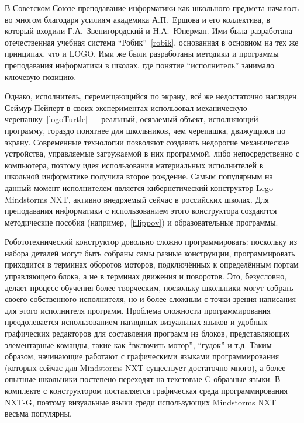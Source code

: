 \documentclass[a4paper]{article}
\begin{document}
В Советском Союзе преподавание информатики как школьного предмета началось во многом благодаря усилиям академика А.П.~Ершова и его коллектива, в который входили Г.А.~Звенигородский и Н.А.~Юнерман. Ими была разработана отечественная учебная система ``Робик''~\ref{robik}, основанная в основном на тех же принципах, что и LOGO. Ими же были разработаны методики и программы преподавания информатики в школах, где понятие ``исполнитель'' занимало ключевую позицию.

Однако, исполнитель, перемещающийся по экрану, всё же недостаточно нагляден. Сеймур Пейперт в своих экспериментах использовал механическую черепашку~\ref{logoTurtle} --- реальный, осязаемый объект, исполняющий программу, гораздо понятнее для школьников, чем черепашка, движущаяся по экрану. Современные технологии позволяют создавать недорогие механические устройства, управляемые загружаемой в них программой, либо непосредственно с компьютера, поэтому идея использования материальных исполнителей в школьной информатике получила второе рождение. Самым популярным на данный момент исполнителем является кибернетический конструктор Lego Mindstorms NXT, активно внедряемый сейчас в российских школах. Для преподавания информатики с использованием этого конструктора создаются методические пособия (например,~\ref{filippov}) и образовательные программы. 

Робототехнический конструктор довольно сложно программировать: поскольку из набора деталей могут быть собраны самы разные конструкции, программировать приходится в терминах оборотов моторов, подключённых к определённым портам управляющего блока, а не в терминах движения и поворотов. Это, безусловно, делает процесс обучения более творческим, поскольку школьники могут собрать своего собственного исполнителя, но и более сложным с точки зрения написания для этого исполнителя программ. Проблема сложности программирования преодолевается использованием наглядных визуальных языков и удобных графических редакторов для составления программ из блоков, представляющих элементарные команды, такие как ``включить мотор'', ``гудок'' и т.д. Таким образом, начинающие работают с графическими языками программирования (которых сейчас для Mindstorms NXT существует достаточно много), а более опытные школьники постепено переходят на текстовые C-образные языки. В комплекте с конструктором поставляется графическая среда программирования NXT-G, поэтому визуальные языки среди использующих Mindstorms NXT весьма популярны.
\end{document}
